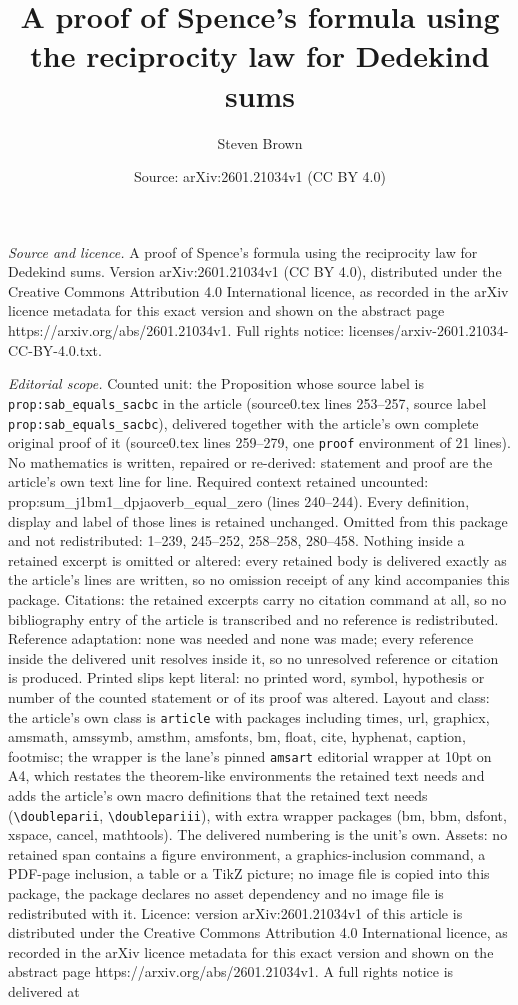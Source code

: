 \documentclass[10pt,a4paper]{amsart}
\title[A proof of Spence's formula using the reciprocity law for De]{A proof of Spence's formula using the reciprocity law for Dedekind sums}
\author{Steven Brown}
\date{Source: arXiv:2601.21034v1 (CC BY 4.0)}
\begin{document}
\maketitle

\noindent\emph{Source and licence.} A proof of Spence's formula using the reciprocity law for Dedekind sums. Version arXiv:2601.21034v1 (CC BY 4.0), distributed under the Creative Commons Attribution 4.0 International licence, as recorded in the arXiv licence metadata for this exact version and shown on the abstract page https://arxiv.org/abs/2601.21034v1. Full rights notice: licenses/arxiv-2601.21034-CC-BY-4.0.txt.\par\smallskip

\noindent\textit{Editorial scope.} Counted unit: the Proposition whose source label is \texttt{prop:sab\_equals\_sacbc} in the article (source0.tex lines 253--257, source label \texttt{prop:sab\_equals\_sacbc}), delivered together with the article's own complete original proof of it (source0.tex lines 259--279, one \texttt{proof} environment of 21 lines). No mathematics is written, repaired or re-derived: statement and proof are the article's own text line for line. Required context retained uncounted: prop:sum\_j1bm1\_dpjaoverb\_equal\_zero (lines 240--244). Every definition, display and label of those lines is retained unchanged. Omitted from this package and not redistributed: 1--239, 245--252, 258--258, 280--458. Nothing inside a retained excerpt is omitted or altered: every retained body is delivered exactly as the article's lines are written, so no omission receipt of any kind accompanies this package. Citations: the retained excerpts carry no citation command at all, so no bibliography entry of the article is transcribed and no reference is redistributed. Reference adaptation: none was needed and none was made; every reference inside the delivered unit resolves inside it, so no unresolved reference or citation is produced. Printed slips kept literal: no printed word, symbol, hypothesis or number of the counted statement or of its proof was altered. Layout and class: the article's own class is \texttt{article} with packages including times, url, graphicx, amsmath, amssymb, amsthm, amsfonts, bm, float, cite, hyphenat, caption, footmisc; the wrapper is the lane's pinned \texttt{amsart} editorial wrapper at 10pt on A4, which restates the theorem-like environments the retained text needs and adds the article's own macro definitions that the retained text needs (\texttt{\textbackslash doubleparii}, \texttt{\textbackslash doublepariii}), with extra wrapper packages (bm, bbm, dsfont, xspace, cancel, mathtools). The delivered numbering is the unit's own. Assets: no retained span contains a figure environment, a graphics-inclusion command, a PDF-page inclusion, a table or a TikZ picture; no image file is copied into this package, the package declares no asset dependency and no image file is redistributed with it. Licence: version arXiv:2601.21034v1 of this article is distributed under the Creative Commons Attribution 4.0 International licence, as recorded in the arXiv licence metadata for this exact version and shown on the abstract page https://arxiv.org/abs/2601.21034v1. A full rights notice is delivered at 
\end{document}

